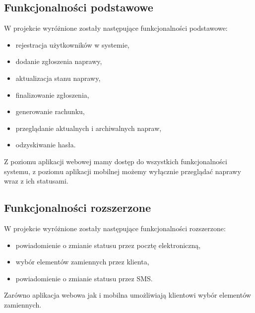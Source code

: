 \documentclass[a4paper,11pt]{article}
\begin{document}
\subsection{Funkcjonalności podstawowe}
W projekcie wyróżnione zostały następujące funkcjonalności podstawowe:
\begin{itemize}
	\item rejestracja użytkowników w systemie,
	\item dodanie zgłoszenia naprawy,
	\item aktualizacja stanu naprawy,
	\item finalizowanie zgłoszenia,
	\item generowanie rachunku,
	\item przeglądanie aktualnych i archiwalnych napraw,
	\item odzyskiwanie hasła.
\end{itemize}
Z poziomu aplikacji webowej mamy dostęp do wszystkich funkcjonalności systemu, z poziomu aplikacji mobilnej możemy wyłącznie przeglądać naprawy wraz z ich statusami.
\subsection{Funkcjonalności rozszerzone}
W projekcie wyróżnione zostały następujące funkcjonalności rozszerzone:
\begin{itemize}
	\item powiadomienie o zmianie statusu przez pocztę elektroniczną,
	\item wybór elementów zamiennych przez klienta,
	\item powiadomienie o zmianie statusu przez SMS.
\end{itemize}
Zarówno aplikacja webowa jak i mobilna umożliwiają klientowi wybór elementów zamiennych.
\end{document}
